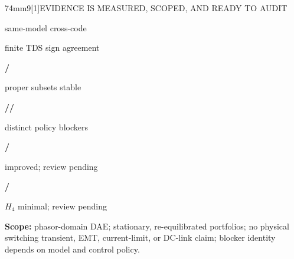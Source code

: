 \documentclass[final]{beamer}
\newcommand{\MetricSize}{\fontsize{38pt}{42pt}\selectfont}
\newcommand{\FigureSize}{\fontsize{24.7pt}{27.2pt}\selectfont}
\begin{document}
\begin{frame}[t]
\noindent\hspace*{6mm}%
\begin{minipage}[t][74mm][t]{902mm}\vspace{0pt}
  \begin{PosterPanel}{74mm}{9}{\scalebox{0.88}[1]{EVIDENCE IS MEASURED, SCOPED, AND READY TO AUDIT}}
    \noindent\begin{minipage}[c][25mm][c]{143mm}\centering
      {\MetricSize\bfseries\color{IASBlue}\CrossCodeAgreement\par}
      {\FigureSize\color{IASDarkText}same-model cross-code\par}
    \end{minipage}\hfill
    \begin{minipage}[c][25mm][c]{143mm}\centering
      {\MetricSize\bfseries\color{IASBlue}\TDSAgreement\par}
      {\FigureSize\color{IASDarkText}finite TDS sign agreement\par}
    \end{minipage}\hfill
    \begin{minipage}[c][25mm][c]{143mm}\centering
      {\MetricSize\bfseries\color{IASBlue}\NumProperStable/\NumProperTotal\par}
      {\FigureSize\color{IASDarkText}proper subsets stable\par}
    \end{minipage}\hfill
    \begin{minipage}[c][25mm][c]{143mm}\centering
      {\MetricSize\bfseries\color{IASBlue}\NumDistinctPolicyA/\NumDistinctPolicyB/\NumDistinctPolicyC\par}
      {\FigureSize\color{IASDarkText}distinct policy blockers\par}
    \end{minipage}\hfill
    \begin{minipage}[c][25mm][c]{143mm}\centering
      {\MetricSize\bfseries\color{IASMidGreen}\InterventionImproves/\NumValidMC\par}
      {\FigureSize\color{IASDarkText}improved; review pending\par}
    \end{minipage}\hfill
    \begin{minipage}[c][25mm][c]{143mm}\centering
      {\MetricSize\bfseries\color{IASGold!70!black}\BlockerPersistenceCount/\NumValidMC\par}
      {\FigureSize\color{IASDarkText}$H_4$ minimal; review pending\par}
    \end{minipage}\par
    \vspace{1mm}
    {\FigureSize\color{IASDarkText}\textbf{Scope:} phasor-domain DAE; stationary, re-equilibrated portfolios; no physical switching transient, EMT, current-limit, or DC-link claim; blocker identity depends on model and control policy.}
  \end{PosterPanel}
\end{minipage}\par
\vspace{3mm}


\end{frame}
\end{document}
